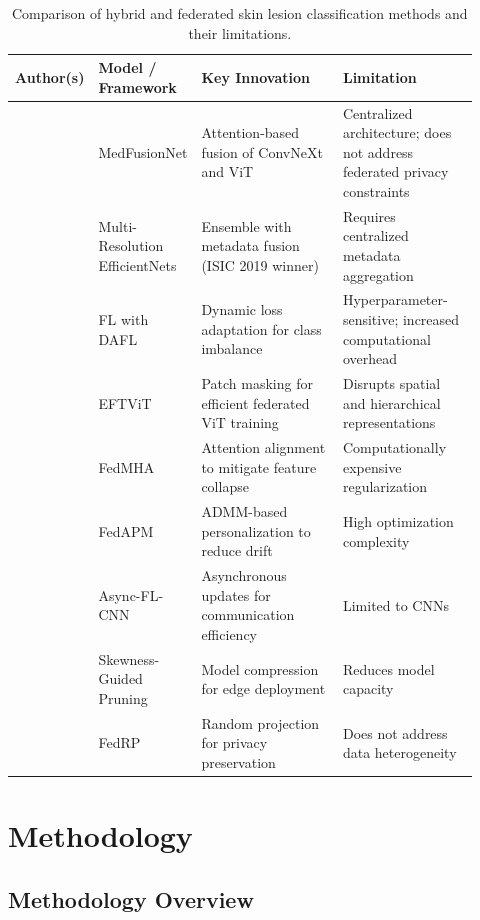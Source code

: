 \documentclass[utf8]{FrontiersinHarvard} %
\begin{document}
\begin{table}[h]
\centering
\small
\caption{Comparison of hybrid and federated skin lesion classification methods and their limitations.}
\label{tab:literature_comparison}
\begin{tabular}{@{}p{0.14\linewidth} p{0.16\linewidth} p{0.32\linewidth} p{0.30\linewidth}@{}}
\toprule
\textbf{Author(s)} & \textbf{Model / Framework} & \textbf{Key Innovation} & \textbf{Limitation} \\
\midrule
\citet{Naeem2025}
& MedFusionNet
& Attention-based fusion of ConvNeXt and ViT
& Centralized architecture; does not address federated privacy constraints \\[4pt]
\citet{Gessert2020}
& Multi-Resolution EfficientNets
& Ensemble with metadata fusion (ISIC 2019 winner)
& Requires centralized metadata aggregation \\[4pt]
\citet{Zhao2025}
& FL with DAFL
& Dynamic loss adaptation for class imbalance
& Hyperparameter-sensitive; increased computational overhead \\[4pt]
\citet{Wu2024}
& EFTViT
& Patch masking for efficient federated ViT training
& Disrupts spatial and hierarchical representations \\[4pt]
\citet{Darzi2024}
& FedMHA
& Attention alignment to mitigate feature collapse
& Computationally expensive regularization \\[4pt]
\citet{Zhu2025}
& FedAPM
& ADMM-based personalization to reduce drift
& High optimization complexity \\[4pt]
\citet{Yaqoob2023}
& Async-FL-CNN
& Asynchronous updates for communication efficiency
& Limited to CNNs \\[4pt]
\citet{Paxton2024}
& Skewness-Guided Pruning
& Model compression for edge deployment
& Reduces model capacity \\[4pt]
\citet{Narimani2024}
& FedRP
& Random projection for privacy preservation
& Does not address data heterogeneity \\
\bottomrule
\end{tabular}
\end{table}

\section{Methodology}

\subsection{Methodology Overview}
\end{document}
